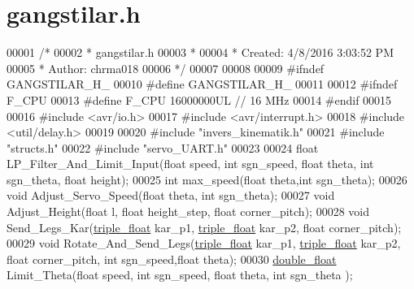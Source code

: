 \hypertarget{gangstilar_8h_source}{}\section{gangstilar.\+h}
\label{gangstilar_8h_source}

\begin{DoxyCode}
00001 \textcolor{comment}{/*}
00002 \textcolor{comment}{ * gangstilar.h}
00003 \textcolor{comment}{ *}
00004 \textcolor{comment}{ * Created: 4/8/2016 3:03:52 PM}
00005 \textcolor{comment}{ *  Author: chrma018}
00006 \textcolor{comment}{ */} 
00007 
00008 
00009 \textcolor{preprocessor}{#ifndef GANGSTILAR\_H\_}
00010 \textcolor{preprocessor}{#define GANGSTILAR\_H\_}
00011 
00012 \textcolor{preprocessor}{#ifndef F\_CPU}
00013 \textcolor{preprocessor}{#define F\_CPU 16000000UL        // 16 MHz}
00014 \textcolor{preprocessor}{#endif}
00015 
00016 \textcolor{preprocessor}{#include <avr/io.h>}
00017 \textcolor{preprocessor}{#include <avr/interrupt.h>}
00018 \textcolor{preprocessor}{#include <util/delay.h>}
00019 
00020 \textcolor{preprocessor}{#include "invers\_kinematik.h"}
00021 \textcolor{preprocessor}{#include "structs.h"}
00022 \textcolor{preprocessor}{#include "servo\_UART.h"}
00023 
00024 \textcolor{keywordtype}{float} LP\_Filter\_And\_Limit\_Input(\textcolor{keywordtype}{float} speed, \textcolor{keywordtype}{int} sgn\_speed, \textcolor{keywordtype}{float} theta, \textcolor{keywordtype}{int} sgn\_theta, \textcolor{keywordtype}{float} height);
00025 \textcolor{keywordtype}{int} max\_speed(\textcolor{keywordtype}{float} theta,\textcolor{keywordtype}{int} sgn\_theta);
00026 \textcolor{keywordtype}{void} Adjust\_Servo\_Speed(\textcolor{keywordtype}{float} theta, \textcolor{keywordtype}{int} sgn\_theta);
00027 \textcolor{keywordtype}{void} Adjust\_Height(\textcolor{keywordtype}{float} l, \textcolor{keywordtype}{float} height\_step, \textcolor{keywordtype}{float} corner\_pitch);
00028 \textcolor{keywordtype}{void} Send\_Legs\_Kar(\hyperlink{structtriple__float}{triple\_float} kar\_p1, \hyperlink{structtriple__float}{triple\_float} kar\_p2, \textcolor{keywordtype}{float} corner\_pitch);
00029 \textcolor{keywordtype}{void} Rotate\_And\_Send\_Legs(\hyperlink{structtriple__float}{triple\_float} kar\_p1, \hyperlink{structtriple__float}{triple\_float} kar\_p2, \textcolor{keywordtype}{float} 
      corner\_pitch, \textcolor{keywordtype}{int} sgn\_speed,\textcolor{keywordtype}{float} theta);
00030 \hyperlink{structdouble__float}{double\_float} Limit\_Theta(\textcolor{keywordtype}{float} speed, \textcolor{keywordtype}{int} sgn\_speed, \textcolor{keywordtype}{float} theta, \textcolor{keywordtype}{int} sgn\_theta );

\end{DoxyCode}
